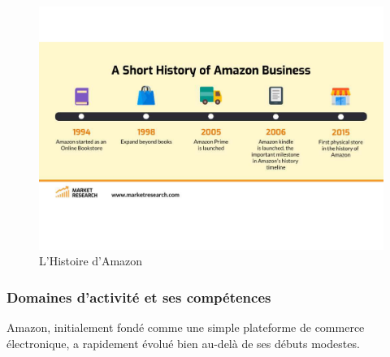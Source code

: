 \begin{figure}[htbp]
        \centering
        \includegraphics[width=0.8\linewidth]{./Graphismes-UTC/logos/Amazon/history.pdf}\hfill
        \caption{L'Histoire d'Amazon \cite{history}}
    \end{figure}




\paragraph{}
\vspace{-2em}  %
\subsubsection{Domaines d'activité et ses compétences}
Amazon, initialement fondé comme une simple plateforme de commerce électronique, a rapidement évolué bien au-delà de ses débuts modestes.
